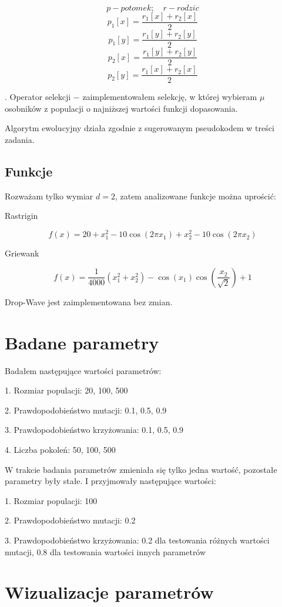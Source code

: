 \documentclass{article}
\begin{document}
$$
p - potomek; \quad r - rodzic
$$
$$
p_1 [x] = \frac{r_1[x] + r_2[x]}{2}
$$
$$
p_1 [y] = \frac{r_1[y] + r_2[y]}{2}
$$
$$
p_2 [x] = \frac{r_1[y] + r_2[y]}{2}
$$
$$
p_2 [y] = \frac{r_1[x] + r_2[x]}{2}
$$

. Operator selekcji $-$ zaimplementowałem selekcję, w której wybieram $\mu$ osobników z populacji o najniższej wartości funkcji dopasowania.

Algorytm ewolucyjny działa zgodnie z sugerowanym pseudokodem w treści zadania.

\subsection{Funkcje}

Rozważam tylko wymiar $d = 2$, zatem analizowane funkcje można uprościć:

Rastrigin

$$
f(x) = 20 + x_1^2 - 10 \cos(2 \pi x_1) + x_2^2 - 10 \cos(2 \pi x_2)
$$

Griewank

$$
f(x) =\frac{1}{4000} (x_1^2 + x_2^2) - \cos\left(x_1\right) \cos\left(\frac{x_2}{\sqrt{2}}\right) + 1
$$

Drop-Wave jest zaimplementowana bez zmian.

\section{Badane parametry}

Badałem następujące wartości parametrów:

1. Rozmiar populacji:  20, 100, 500

2. Prawdopodobieństwo mutacji: 0.1, 0.5, 0.9

3. Prawdopodobieństwo krzyżowania: 0.1, 0.5, 0.9

4. Liczba pokoleń: 50, 100, 500



W trakcie badania parametrów zmieniała się tylko jedna wartość, pozostałe parametry były stałe. I przyjmowały następujące wartości:
\pagebreak

1. Rozmiar populacji: 100

2. Prawdopodobieństwo mutacji: 0.2

3. Prawdopodobieństwo krzyżowania: 0.2 dla testowania różnych wartości mutacji, 0.8 dla testowania wartości innych parametrów

\section{Wizualizacje parametrów}
\end{document}
